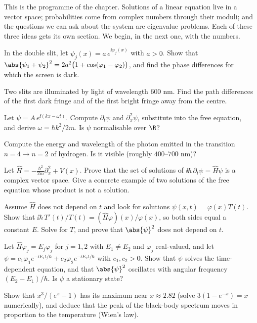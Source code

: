 This is the programme of the chapter. Solutions of a linear equation live in a vector space; probabilities come from complex numbers through their moduli; and the questions we can ask about the system are eigenvalue problems. Each of these three ideas gets its own section. We begin, in the next one, with the numbers.

\begin{exerciseset}
   In the double slit, let $\psi_j(x)=a\,e^{\ii\varphi_j(x)}$ with $a>0$. Show that $\abs{\psi_1+\psi_2}^2=2a^2\bigl(1+\cos(\varphi_1-\varphi_2)\bigr)$, and find the phase differences for which the screen is dark.

   Two slits are illuminated by light of wavelength $600$ nm. Find the path differences of the first dark fringe and of the first bright fringe away from the centre.

   Let $\psi=A\,e^{\ii(kx-\omega t)}$. Compute $\partial_t\psi$ and $\partial_x^2\psi$, substitute into the free equation, and derive $\omega=\hbar k^2/2m$. Is $\psi$ normalisable over $\R$?

   Compute the energy and wavelength of the photon emitted in the transition $n=4\to n=2$ of hydrogen. Is it visible (roughly $400$--$700$ nm)?

   Let $\hat H=-\frac{\hbar^2}{2m}\partial_x^2+V(x)$. Prove that the set of solutions of $\ii\hbar\,\partial_t\psi=\hat H\psi$ is a complex vector space. Give a concrete example of two solutions of the free equation whose product is not a solution.

  \label{ex:separation} Assume $\hat H$ does not depend on $t$ and look for solutions $\psi(x,t)=\varphi(x)T(t)$. Show that $\ii\hbar\,T'(t)/T(t)=(\hat H\varphi)(x)/\varphi(x)$, so both sides equal a constant $E$. Solve for $T$, and prove that $\abs{\psi}^2$ does not depend on $t$.

   Let $\hat H\varphi_j=E_j\varphi_j$ for $j=1,2$ with $E_1\neq E_2$ and $\varphi_j$ real-valued, and let $\psi=c_1\varphi_1e^{-\ii E_1t/\hbar}+c_2\varphi_2e^{-\ii E_2t/\hbar}$ with $c_1,c_2>0$. Show that $\psi$ solves the time-dependent equation, and that $\abs{\psi}^2$ oscillates with angular frequency $(E_2-E_1)/\hbar$. Is $\psi$ a stationary state?

   Show that $x^3/(e^x-1)$ has its maximum near $x\approx2.82$ (solve $3(1-e^{-x})=x$ numerically), and deduce that the peak of the black-body spectrum moves in proportion to the temperature (Wien's law).
\end{exerciseset}
